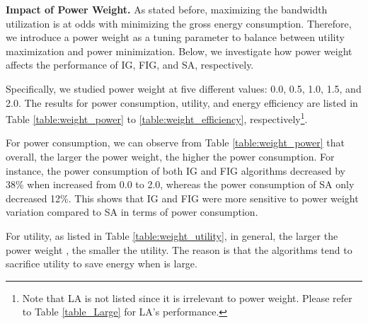 \documentclass[conference]{IEEEtran}
\begin{document}
\noindent \textbf{Impact of Power Weight.} As stated before, maximizing the bandwidth utilization is at odds with minimizing the gross energy consumption. Therefore, we introduce a power weight as a tuning parameter to balance between utility maximization and power minimization. Below, we investigate how power weight affects the performance of IG, FIG, and SA, respectively.

Specifically, we studied power weight  at five different values: 0.0, 0.5, 1.0, 1.5, and 2.0. The results for power consumption, utility, and energy efficiency are listed in Table \ref{table:weight_power} to \ref{table:weight_efficiency}, respectively\footnote{Note that LA is not listed since it is irrelevant to power weight. Please refer to Table \ref{table_Large} for LA's performance.}. 

For power consumption, we can observe from Table \ref{table:weight_power} that overall, the larger the power weight, the higher the power consumption. For instance, the power consumption of both IG and FIG algorithms decreased by 38\% when  increased from 0.0 to 2.0, whereas the power consumption of SA only decreased 12\%. This shows that IG and FIG were more sensitive to power weight variation compared to SA in terms of power consumption. 

\begin{table}[!htbp] \renewcommand{\arraystretch}{1}
\small
\begin{center}
\caption{Power Consumption (/Watt) for Different Power Weights } 
\centering 
{}
\label{table:weight_power} 
\end{center}
\end{table}


For utility, as listed in Table \ref{table:weight_utility}, in general, the larger the power weight , the smaller the utility. The reason is that the algorithms tend to sacrifice utility to save energy when  is large. 
\end{document}
